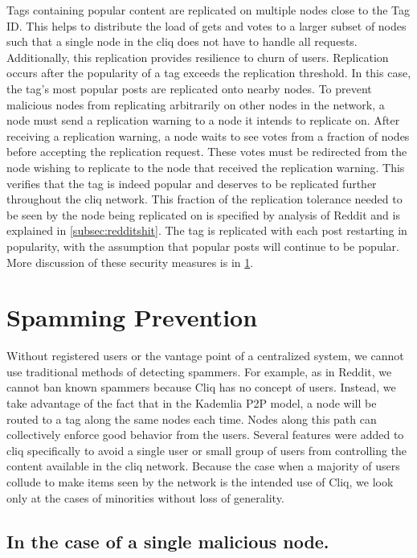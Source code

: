 \documentclass{sig-alternate}
\begin{document}
Tags containing popular content are replicated on multiple nodes close to the Tag ID. 
This helps to distribute the load of gets and votes to a larger subset of nodes such that a single node in the cliq does not have to handle all requests. 
Additionally, this replication provides resilience to churn of users. 
Replication occurs after the popularity of a tag exceeds the replication threshold. In this case, the tag's most popular posts are replicated onto nearby nodes. 
To prevent malicious nodes from replicating arbitrarily on other nodes in the network, a node must send a replication warning to a node it intends to replicate on. 
After receiving a replication warning, a node waits to see votes from a fraction of nodes before accepting the replication request. 
These votes must be redirected from the node wishing to replicate to the node that received the replication warning. 
This verifies that the tag is indeed popular and deserves to be replicated further throughout the cliq network. 
This fraction of the replication tolerance needed to be seen by the node being replicated on is specified by analysis of Reddit and is explained in \ref{subsec:redditshit}. 
The tag is replicated with each post restarting in popularity, with the assumption that popular posts will continue to be popular. 
More discussion of these security measures is in \ref{sec:spam}. 

\section{Spamming Prevention}
\label{sec:spam}
Without registered users or the vantage point of a centralized system, we cannot use traditional methods of detecting spammers. For example, as in Reddit, we cannot ban known spammers because Cliq has no concept of users.  Instead, we take advantage of the fact that in the Kademlia P2P model, a node will be routed to a tag along the same nodes each time. Nodes along this path can collectively enforce good behavior from the users. Several features were added to cliq specifically to avoid a single user or small group of users from controlling the content available in the cliq network. Because the case when a majority of users collude to make items seen by the network is the intended use of Cliq, we look only at the cases of minorities without loss of generality. 

\subsection{In the case of a single malicious node.}
\label{subsec:spamsingle}
\end{document}
